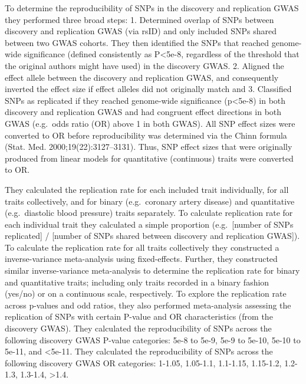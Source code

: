 \documentclass[
]{book}
\begin{document}
To determine the reproducibility of SNPs in the discovery and replication GWAS they performed three broad steps: 1. Determined overlap of SNPs between discovery and replication GWAS (via rsID) and only included SNPs shared between two GWAS cohorts. They then identified the SNPs that reached genome-wide significance (defined consistently as P\textless5e-8, regardless of the threshold that the original authors might have used) in the discovery GWAS. 2. Aligned the effect allele between the discovery and replication GWAS, and consequently inverted the effect size if effect alleles did not originally match and 3. Classified SNPs as replicated if they reached genome-wide significance (p\textless5e-8) in both discovery and replication GWAS and had congruent effect directions in both GWAS (e.g.~odds ratio (OR) above 1 in both GWAS). All SNP effect sizes were converted to OR before reproducibility was determined via the Chinn formula (Stat. Med. 2000;19(22):3127--3131). Thus, SNP effect sizes that were originally produced from linear models for quantitative (continuous) traits were converted to OR.

They calculated the replication rate for each included trait individually, for all traits collectively, and for binary (e.g.~coronary artery disease) and quantitative (e.g.~diastolic blood pressure) traits separately. To calculate replication rate for each individual trait they calculated a simple proportion (e.g.~{[}number of SNPs replicated{]} / {[}number of SNPs shared between discovery and replication GWAS{]}). To calculate the replication rate for all traits collectively they constructed a inverse-variance meta-analysis using fixed-effects. Further, they constructed similar inverse-variance meta-analysis to determine the replication rate for binary and quantitative traits; including only traits recorded in a binary fashion (yes/no) or on a continuous scale, respectively. To explore the replication rate across p-values and odd ratios, they also performed meta-analysis assessing the replication of SNPs with certain P-value and OR characteristics (from the discovery GWAS). They calculated the reproducibility of SNPs across the following discovery GWAS P-value categories: 5e-8 to 5e-9, 5e-9 to 5e-10, 5e-10 to 5e-11, and \textless5e-11. They calculated the reproducibility of SNPs across the following discovery GWAS OR categories: 1-1.05, 1.05-1.1, 1.1-1.15, 1.15-1.2, 1.2-1.3, 1.3-1.4, \textgreater1.4.
\end{document}
